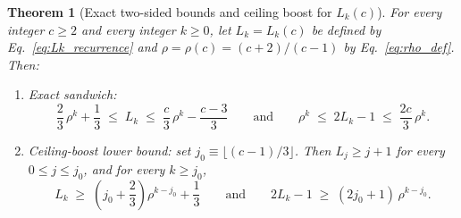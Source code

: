 \documentclass[11pt,a4paper]{article}
\theoremstyle{plain}
\newtheorem{theorem}{Theorem}[section]
\theoremstyle{definition}
\theoremstyle{remark}
\begin{document}
\begin{theorem}[Exact two-sided bounds and ceiling boost for $L_k(c)$]
\label{thm:lk_sandwich}
For every integer $c \ge 2$ and every integer $k \ge 0$, let $L_k = L_k(c)$ be defined by Eq.~\eqref{eq:Lk_recurrence} and $\rho = \rho(c) = (c + 2)/(c - 1)$ by Eq.~\eqref{eq:rho_def}. Then:
\begin{enumerate}[label=(\roman*)]
\item Exact sandwich:
\begin{equation}
    \boxed{\frac{2}{3}\,\rho^k + \frac{1}{3} \;\le\; L_k \;\le\; \frac{c}{3}\,\rho^k - \frac{c - 3}{3}} \qquad\text{and}\qquad \boxed{\rho^k \;\le\; 2 L_k - 1 \;\le\; \frac{2c}{3}\,\rho^k} .
    \label{eq:lk_sandwich}
\end{equation}
\item Ceiling-boost lower bound: set $j_0 \equiv \lfloor (c - 1)/3 \rfloor$. Then $L_j \ge j + 1$ for every $0 \le j \le j_0$, and for every $k \ge j_0$,
\begin{equation}
    L_k \;\ge\; \left(j_0 + \frac{2}{3}\right)\rho^{k - j_0} + \frac{1}{3} \qquad\text{and}\qquad 2 L_k - 1 \;\ge\; (2 j_0 + 1)\,\rho^{k - j_0} .
    \label{eq:lk_ceiling_boost}
\end{equation}
\end{enumerate}
\end{theorem}
\end{document}
